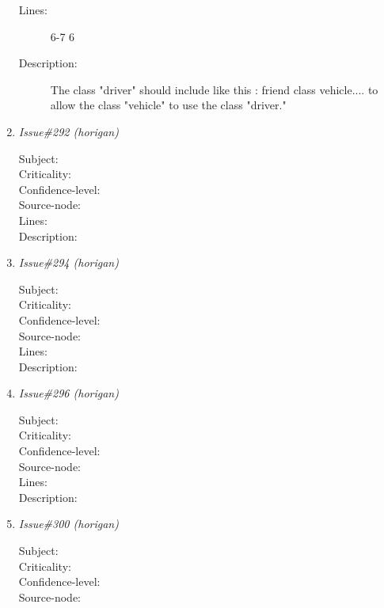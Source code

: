 \begin{enumerate}
\begin{description}
\item [Lines:] 6-7 6

\item [Description:] The class "driver" should include like this :
 friend class vehicle....  to allow the class "vehicle" to use the class
"driver."
\end{description}
\item {\it Issue\#292 (horigan)}
\begin{description}
\item [Subject:] 
\item [Criticality:] 
\item [Confidence-level:] 
\item [Source-node:] 

\item [Lines:] 

\item [Description:] 
\end{description}
\item {\it Issue\#294 (horigan)}
\begin{description}
\item [Subject:] 
\item [Criticality:] 
\item [Confidence-level:] 
\item [Source-node:] 

\item [Lines:] 

\item [Description:] 
\end{description}
\item {\it Issue\#296 (horigan)}
\begin{description}
\item [Subject:] 
\item [Criticality:] 
\item [Confidence-level:] 
\item [Source-node:] 

\item [Lines:] 

\item [Description:] 
\end{description}
\item {\it Issue\#300 (horigan)}
\begin{description}
\item [Subject:] 
\item [Criticality:] 
\item [Confidence-level:] 
\item [Source-node:] 


\end{description}
\end{enumerate}
